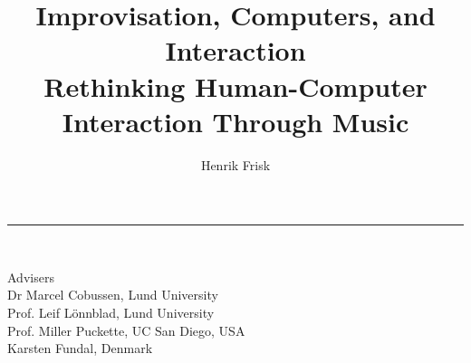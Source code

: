 \documentclass[a4paper]{book}
\title{\usefont{T1}{phv}{m}{n}Improvisation, Computers, and Interaction\\{\small Rethinking Human-Computer Interaction Through Music}}
\author{Henrik Frisk}
\date{}
\numberwithin{equation}{section}
\begin{document}
\pagestyle{empty}
\clearpage
% 

\rule{\linewidth}{0.4mm}
\vspace{2cm}

\begin{minipage}[l]{\linewidth}
\end{minipage}
\\[10cm]

\begin{minipage}[l]{\linewidth}
Advisers
\\[.3cm]
Dr Marcel Cobussen, Lund University\\
Prof. Leif L\"{o}nnblad, Lund University\\
Prof. Miller Puckette, UC San Diego, USA\\
Karsten Fundal, Denmark
\end{minipage}
\end{document}
